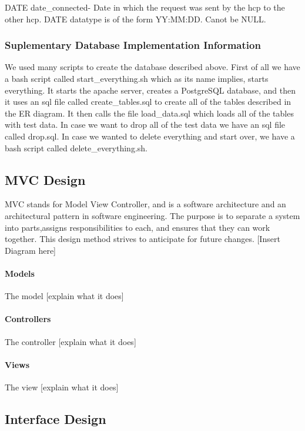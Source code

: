 \documentclass[12pt]{report}
\begin{document}
DATE date\_connected- Date in which the request was sent by the hcp to the other hcp.  DATE datatype is of the form YY:MM:DD.  Canot be NULL.\\

\subsubsection{Suplementary Database Implementation Information}
We used many scripts to create the database described above.  First of all we have a bash script called start\_everything.sh which as its name implies, starts everything.  It starts the apache server, creates a PostgreSQL database, and then it uses an sql file called create\_tables.sql to create all of the tables described in the ER diagram.  It then calls the file load\_data.sql which loads all of the tables with test data.  In case we want to drop all of the test data we have an sql file called drop.sql.  In case we wanted to delete everything and start over, we have a bash script called delete\_everything.sh.     

\subsection{MVC Design}

MVC stands for Model View Controller, and is a software architecture and an architectural pattern in software engineering. The purpose is to separate a system into parts,assigns responsibilities to each, and ensures that they can work together. This design method strives to anticipate for future changes.
[Insert Diagram here]
\paragraph{Models}
The model [explain what it does]

\paragraph{Controllers}
The controller [explain what it does]

\paragraph{Views}
The view [explain what it does]

\subsection{Interface Design}
\end{document}
